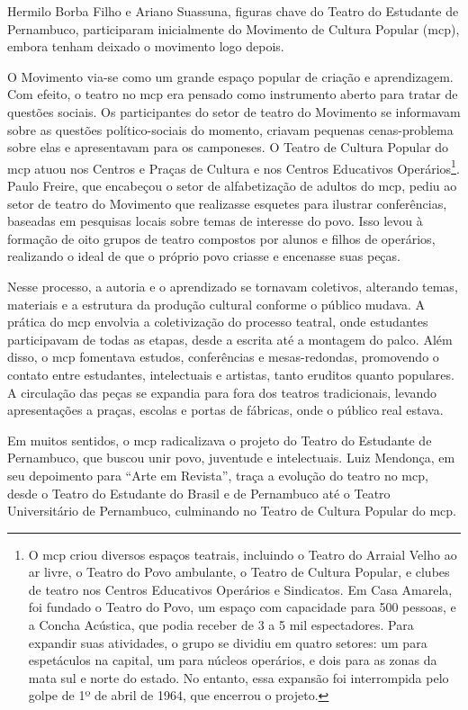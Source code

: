 Hermilo Borba Filho e Ariano Suassuna, figuras chave do Teatro do
Estudante de Pernambuco, participaram inicialmente do Movimento de
Cultura Popular ({\sc mcp}), embora tenham deixado o movimento logo depois.

O Movimento via-se como um grande espaço popular de criação e
aprendizagem. Com efeito, o teatro no {\sc mcp} era pensado como instrumento
aberto para tratar de questões sociais. Os participantes do setor de
teatro do Movimento se informavam sobre as questões político-sociais do
momento, criavam pequenas cenas-problema sobre elas e apresentavam para
os camponeses. O Teatro de Cultura Popular do {\sc mcp} atuou nos Centros e
Praças de Cultura e nos Centros Educativos Operários\footnote{O {\sc mcp}
  criou diversos espaços teatrais, incluindo o Teatro do Arraial Velho
  ao ar livre, o Teatro do Povo ambulante, o Teatro de Cultura Popular,
  e clubes de teatro nos Centros Educativos Operários e Sindicatos. Em
  Casa Amarela, foi fundado o Teatro do Povo, um espaço com capacidade
  para 500 pessoas, e a Concha Acústica, que podia receber de 3 a 5 mil
  espectadores. Para expandir suas atividades, o grupo se dividiu em
  quatro setores: um para espetáculos na capital, um para núcleos
  operários, e dois para as zonas da mata sul e norte do estado. No
  entanto, essa expansão foi interrompida pelo golpe de 1º de abril de
  1964, que encerrou o projeto.}. Paulo Freire, que encabeçou o setor de
alfabetização de adultos do {\sc mcp}, pediu ao setor de teatro do Movimento
que realizasse esquetes para ilustrar conferências, baseadas em
pesquisas locais sobre temas de interesse do povo. Isso levou à formação
de oito grupos de teatro compostos por alunos e filhos de operários,
realizando o ideal de que o próprio povo criasse e encenasse suas peças.

Nesse processo, a autoria e o aprendizado se tornavam coletivos,
alterando temas, materiais e a estrutura da produção cultural conforme o
público mudava. A prática do {\sc mcp} envolvia a coletivização do processo
teatral, onde estudantes participavam de todas as etapas, desde a
escrita até a montagem do palco. Além disso, o {\sc mcp} fomentava estudos,
conferências e mesas-redondas, promovendo o contato entre estudantes,
intelectuais e artistas, tanto eruditos quanto populares. A circulação
das peças se expandia para fora dos teatros tradicionais, levando
apresentações a praças, escolas e portas de fábricas, onde o público
real estava.

Em muitos sentidos, o {\sc mcp} radicalizava o projeto do Teatro do Estudante
de Pernambuco, que buscou unir povo, juventude e intelectuais. Luiz
Mendonça, em seu depoimento para “Arte em Revista”, traça a evolução do
teatro no {\sc mcp}, desde o Teatro do Estudante do Brasil e de Pernambuco até
o Teatro Universitário de Pernambuco, culminando no Teatro de Cultura
Popular do {\sc mcp}.

